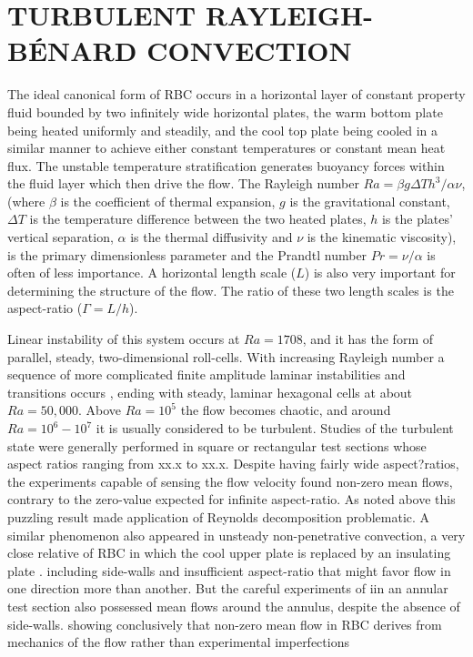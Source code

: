\documentclass[twocolumn,10pt]{tsfp}
\begin{document}
\section*{TURBULENT RAYLEIGH-B\'{E}NARD CONVECTION}
     The ideal canonical form of RBC occurs in a horizontal layer of constant property fluid bounded by two infinitely wide horizontal plates, the warm bottom plate being heated uniformly and steadily, and the cool top plate being cooled in a similar manner to achieve either constant temperatures or constant mean heat flux.   
%
The unstable temperature stratification generates buoyancy forces within the fluid layer which then drive the flow. The Rayleigh number $Ra=\beta g \Delta T h^3/\alpha \nu$, (where $\beta$ is the coefficient of thermal expansion, $g$ is the gravitational constant, $\Delta T$ is the temperature difference between the two heated plates, $h$ is the plates' vertical separation, $\alpha$ is the thermal diffusivity and $\nu$ is the kinematic viscosity), is the primary dimensionless parameter and the Prandtl number $Pr=\nu/\alpha$ is often of less importance. A horizontal length scale ($L$) is also very important for determining the structure of the flow. The ratio of these two length scales is the aspect-ratio ($\Gamma=L/h$).

    Linear instability of this system occurs at $Ra=1708$, and it has the form of parallel, steady, two-dimensional roll-cells. With increasing Rayleigh number a sequence of more complicated finite amplitude laminar instabilities and transitions occurs \citep{busse1971instabilities,busse1974oscillatory,busse1978non}, ending with steady, laminar hexagonal cells at about $Ra=50,000$. Above $Ra= 10^5$ the flow becomes chaotic, and around $Ra=10^6-10^7$ it is usually considered to be turbulent. Studies of the turbulent state \citep{chu1973turbulent,garon1973velocity,willis1970oscillatory,fitzjarrald1976experimental} were generally performed in square or rectangular test sections whose aspect ratios ranging from xx.x to xx.x. Despite having fairly wide aspect?ratios, the experiments capable of sensing the flow velocity found non-zero mean flows, contrary to the zero-value expected for infinite aspect-ratio. As noted above this puzzling result made application of Reynolds decomposition problematic. A similar phenomenon also appeared in unsteady non-penetrative convection, a very close relative of RBC in which the cool upper plate is replaced by an insulating plate \citep{adrian1986turbulent}. including side-walls and insufficient aspect-ratio that might favor flow in one direction more than another. But the careful experiments of \cite{krishnamurti1981large} iin an annular test section also possessed mean flows around the annulus, despite the absence of side-walls. showing conclusively that non-zero mean flow in RBC derives from mechanics of the flow rather than experimental imperfections
\end{document}
